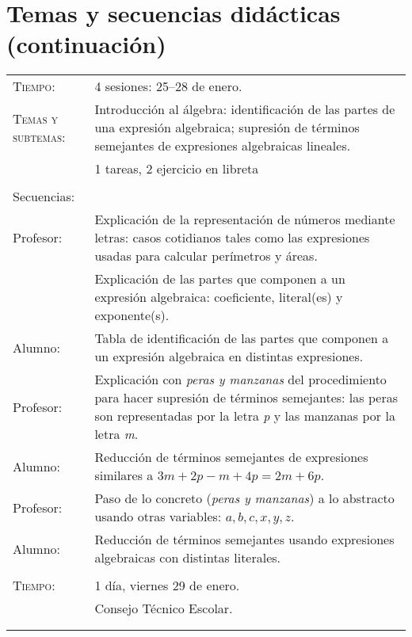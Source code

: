 \documentclass[letterpaper,10pt]{article}
\begin{document}
\newpage
\section{Temas  y secuencias did\'acticas (continuaci\'on)}

\begin{tabular}[t]{R{0.25\textwidth}p{0.71\textwidth}}
    \textsc{Tiempo:}          & 4 sesiones: 25--28  de enero. \\
    \textsc{Temas y subtemas:}& Introducci\'on al \'algebra:
    identificaci\'on de las partes de una expresi\'on algebraica; supresi\'on de
    t\'erminos semejantes de expresiones algebraicas lineales.\\    
    & 1 tareas, 2 ejercicio en libreta\\ \\
    \large{\sc Secuencias:} \\
    Profesor:   & Explicaci\'on de la representaci\'on de n\'umeros mediante
    letras: casos cotidianos tales como las expresiones usadas para calcular
    per\'imetros y \'areas. \\ & Explicaci\'on de las partes que componen a un
    expresi\'on algebraica: coeficiente, literal(es) y exponente(s). \\    
    Alumno:     & Tabla de identificaci\'on de las partes que componen a un
    expresi\'on algebraica en distintas expresiones. \\    
    Profesor:   & Explicaci\'on con \emph{peras y manzanas} del procedimiento
    para hacer supresi\'on de t\'erminos semejantes: las peras son representadas
    por la letra \emph{p} y las manzanas por la letra \emph{m}. \\    
    Alumno:     & Reducci\'on de t\'erminos semejantes de expresiones similares
    a $3m+2p-m+4p=2m+6p$. \\    
    Profesor:   & Paso de lo concreto (\emph{peras y manzanas}) a lo abstracto
    usando otras variables: $a,b,c,x,y,z$. \\    
    Alumno:     & Reducci\'on de t\'erminos semejantes usando expresiones
    algebraicas con distintas literales.
\\ \hline \\
    \textsc{Tiempo:}& 1 d\'ia, viernes 29 de enero. \\
                    & {\Large \sc Consejo T\'ecnico Escolar.} \\ 
\\ \hline \\

\end{tabular}
\end{document}
